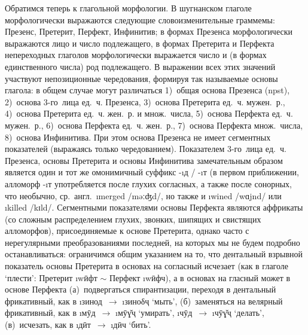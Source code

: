 Обратимся теперь к глагольной морфологии. В шугнанском глаголе морфологически выражаются следующие словоизменительные граммемы: Презенс, Претерит, Перфект, Инфинитив; в формах Презенса морфологически выражаются лицо и число подлежащего, в формах Претерита и Перфекта непереходных глаголов морфологически выражается число и (в формах единственного числа) род подлежащего. В выражении всех этих значений участвуют непозиционные чередования, формируя так называемые основы глагола: в общем случае могут различаться 1)~общая основа Презенса ({\sc npst}), 2)~основа 3-го~лица ед.~ч. Презенса, 3)~основа Претерита ед.~ч. мужен.~р., 4)~основа Претерита ед.~ч. жен.~р. и множ.~числа, 5)~основа Перфекта ед.~ч. мужен.~р., 6)~основа Перфекта ед.~ч. жен.~р., 7)~основа Перфекта множ.~числа, 8)~основа Инфинитива. При этом основа Презенса не имеет сегментных показателей (выражаясь только чередованием). Показателем 3-го~лица ед.~ч. Презенса, основы Претерита и основы Инфинитива замечательным образом является один и тот же омонимичный суффикс -\i{д} / -\i{т} (в первом приближении, алломорф -\i{т} употребляется после глухих согласных, а также после сонорных, что необычно, ср.~англ.~\i{merged} /məːʤd/, но также и \i{wined} /wɑjnd/ или \i{killed} /kɪld/. Сегментными показателями основы Перфекта являются аффрикаты (со сложным распределением глухих, звонких, шипящих и свистящих алломорфов), присоединяемые к основе Претерита, однако часто с нерегулярными преобразованиями последней, на которых мы не будем подробно останавливаться: ограничимся общим указанием на то, что дентальный взрывной показатель основы Претерита в основах на согласный исчезает (как в глаголе ‘плести’: Претерит \i{wӣфт} $\sim$ Перфект \i{wӣфч}), а в основах на гласный может в основе Перфекта (а)~подвергаться спирантизации, переходя в дентальный фрикативный, как в \i{зинод}~$\rightarrow$ \i{зиноδҷ} ‘мыть’, (б)~заменяться на велярный фрикативный, как в \i{мӯд}~$\rightarrow$ \i{мӯɣ̌ҷ} ‘умирать’, \i{чӯд}~$\rightarrow$ \i{чӯɣ̌ҷ} ‘делать’, (в)~исчезать, как в \i{дӣт}~$\rightarrow$ \i{дӣч} ‘бить’.

